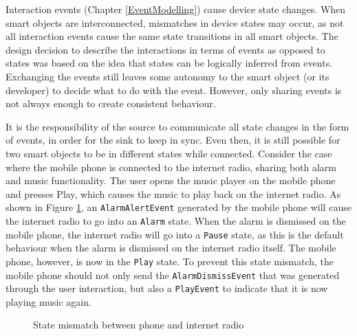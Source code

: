 Interaction events (Chapter \ref{EventModelling}) cause device state changes. When smart objects are interconnected, mismatches in device states may occur, as not all interaction events cause the same state transitions in all smart objects. The design decision to describe the interactions in terms of events as opposed to states was based on the idea that states can be logically inferred from events. Exchanging the events still leaves some autonomy to the smart object (or its developer) to decide what to do with the event. However, only sharing events is not always enough to create consistent behaviour. 

It is the responsibility of the source to communicate all state changes in the form of events, in order for the sink to keep in sync. Even then, it is still possible for two smart objects to be in different states while connected. Consider the case where the mobile phone is connected to the internet radio, sharing both alarm and music functionality. The user opens the music player on the mobile phone and presses Play, which causes the music to play back on the internet radio. As shown in Figure \ref{fsmPlayAlarm}, an \texttt{AlarmAlertEvent} generated by the mobile phone will cause the internet radio to go into an \texttt{Alarm} state. When the alarm is dismissed on the mobile phone, the internet radio will go into a \texttt{Pause} state, as this is the default behaviour when the alarm is dismissed on the internet radio itself. The mobile phone, however, is now in the \texttt{Play} state. To prevent this state mismatch, the mobile phone should not only send the \texttt{AlarmDismissEvent} that was generated through the user interaction, but also a \texttt{PlayEvent} to indicate that it is now playing music again.


\begin{figure}[bth]
    \caption{State mismatch between phone and internet radio}
   \label{fsmPlayAlarm}
\end{figure}



